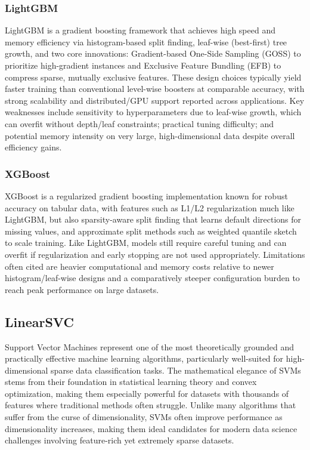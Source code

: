 \documentclass[
  titlepage]{article}
\begin{document}
\subsubsection{LightGBM}\label{lightgbm}

LightGBM is a gradient boosting framework that achieves high speed and
memory efficiency via histogram-based split finding, leaf-wise
(best-first) tree growth, and two core innovations: Gradient-based
One-Side Sampling (GOSS) to prioritize high-gradient instances and
Exclusive Feature Bundling (EFB) to compress sparse, mutually exclusive
features. These design choices typically yield faster training than
conventional level-wise boosters at comparable accuracy, with strong
scalability and distributed/GPU support reported across applications.
Key weaknesses include sensitivity to hyperparameters due to leaf-wise
growth, which can overfit without depth/leaf constraints; practical
tuning difficulty; and potential memory intensity on very large,
high-dimensional data despite overall efficiency gains.

\subsubsection{XGBoost}\label{xgboost}

XGBoost is a regularized gradient boosting implementation known for
robust accuracy on tabular data, with features such as L1/L2
regularization much like LightGBM, but also sparsity-aware split finding
that learns default directions for missing values, and approximate split
methods such as weighted quantile sketch to scale training. Like
LightGBM, models still require careful tuning and can overfit if
regularization and early stopping are not used appropriately.
Limitations often cited are heavier computational and memory costs
relative to newer histogram/leaf-wise designs and a comparatively
steeper configuration burden to reach peak performance on large
datasets.

\subsection{LinearSVC}\label{linearsvc}

Support Vector Machines represent one of the most theoretically grounded
and practically effective machine learning algorithms, particularly
well-suited for high-dimensional sparse data classification tasks. The
mathematical elegance of SVMs stems from their foundation in statistical
learning theory and convex optimization, making them especially powerful
for datasets with thousands of features where traditional methods often
struggle. Unlike many algorithms that suffer from the curse of
dimensionality, SVMs often improve performance as dimensionality
increases, making them ideal candidates for modern data science
challenges involving feature-rich yet extremely sparse datasets.
\end{document}
